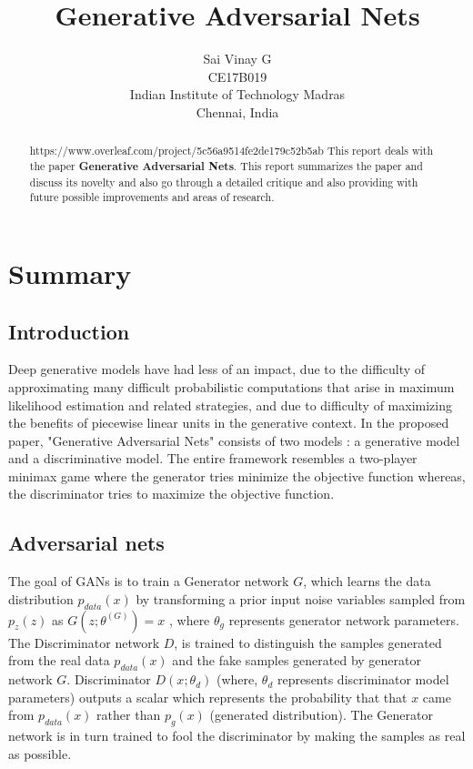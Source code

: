 \documentclass [11pt]{article}
\title{Generative Adversarial Nets}
\author{
Sai Vinay G \\
CE17B019 \\
Indian Institute of Technology Madras \\
Chennai, India \\
}
\begin{document}
\maketitle
\begin{abstract}https://www.overleaf.com/project/5c56a9514fe2de179c52b5ab
    This report deals with the paper \textbf{Generative Adversarial Nets}.
    This report summarizes the paper and discuss its novelty and also go through a detailed
    critique and also providing with future possible improvements and areas of research.
\end{abstract}

\section{Summary}

\vspace{0.5cm}

\subsection{Introduction}
\hspace{1cm}    Deep generative models have had less of an impact, due to the difficulty of approximating  many difficult probabilistic computations that arise in maximum likelihood estimation and related strategies, and due to difficulty of maximizing the benefits of piecewise linear units in the generative context. In the proposed paper, "Generative Adversarial Nets" consists of two models : a generative model and a discriminative model. The  entire framework resembles a two-player minimax game where
the generator tries minimize the objective function whereas, the discriminator tries to maximize the objective function.

\vspace{0.5cm}

\subsection{Adversarial nets}
\hspace{1cm}    The goal of GANs is to train a Generator network $G$, which learns the data distribution $p_{data}(x)$ by transforming a prior input noise variables sampled from $p_z(z)$ as  $ G(z;\theta^{(G)}) = x$ , where $\theta_g$ represents generator network parameters. The Discriminator network $D$, is trained to distinguish the samples generated from the real data  $p_{data}(x)$ and the fake samples generated by generator network $G$. Discriminator $D(x;\theta_d)$ (where, $\theta_d$ represents discriminator model parameters) outputs a scalar which represents the probability that that $x$ came from $p_{data}(x)$ rather than $p_{g}(x)$ (generated distribution). The Generator network is in turn trained to fool the discriminator by making the samples as real as possible.
\end{document}
